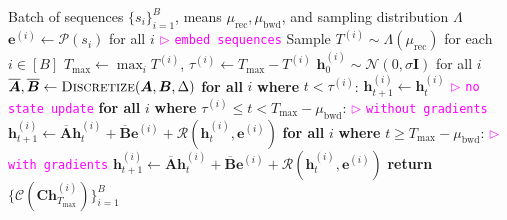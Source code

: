 \begin{algorithm}[!ht]
\caption{Efficient Per-Sequence Stochastic Depth Training}
\label{alg:per-sequence-depth}
\begin{algorithmic}[1]
\Require Batch of sequences $\{s_i\}_{i=1}^{B}$, means $\mu_{\text{rec}}, \mu_{\text{bwd}}$, and sampling distribution $\Lambda$
\State $\bm{e}^{(i)} \gets \mathcal{P}(s_i)$ for all $i$ \hfill  \textcolor{magenta}{$\triangleright$ \texttt{embed sequences}}
\State Sample $T^{(i)} \sim \Lambda(\mu_{\text{rec}})$ for each $i \in [B]$
\State $T_{\max} \gets \max_i T^{(i)}$, \quad $\tau^{(i)} \gets T_{\max} - T^{(i)}$
\State $\bm{h}_0^{(i)} \sim \mathcal{N}(0, \sigma \bm{I})$ for all $i$
\State $\overline{\bm{A}}, \overline{\bm{B}} \gets \textsc{Discretize}(\bm{A}, \bm{B}, \Delta)$
    \State \textbf{for all} $i$ \textbf{where} $t < \tau^{(i)}$: \quad $\bm{h}_{t+1}^{(i)} \gets \bm{h}_t^{(i)}$ \hfill  \textcolor{magenta}{$\triangleright$ \texttt{no state update}}
    \State \textbf{for all} $i$ \textbf{where} $\tau^{(i)} \leq t < T_{\max} - \mu_{\text{bwd}}$: \hfill  \textcolor{magenta}{$\triangleright$ \texttt{without gradients}}
    \State \quad $\bm{h}_{t+1}^{(i)} \gets \overline{\bm{A}} \bm{h}_t^{(i)} + \overline{\bm{B}} \bm{e}^{(i)} + \mathcal{R}(\bm{h}_t^{(i)}, \bm{e}^{(i)})$
    \State \textbf{for all} $i$ \textbf{where} $t \geq T_{\max} - \mu_{\text{bwd}}$: \hfill  \textcolor{magenta}{$\triangleright$ \texttt{with gradients}}
    \State \quad $\bm{h}_{t+1}^{(i)} \gets \overline{\bm{A}} \bm{h}_t^{(i)} + \overline{\bm{B}} \bm{e}^{(i)} + \mathcal{R}(\bm{h}_t^{(i)}, \bm{e}^{(i)})$
\EndFor
\State \textbf{return} $\{\mathcal{C}(\bm{C} \bm{h}_{T_{\max}}^{(i)})\}_{i=1}^{B}$
\end{algorithmic}
\end{algorithm}
